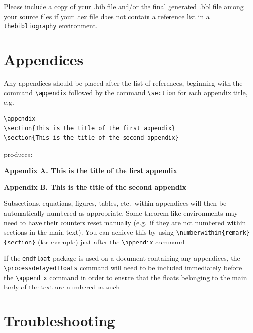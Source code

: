\documentclass[]{interact}
\theoremstyle{plain}%
\theoremstyle{definition}
\theoremstyle{remark}
\begin{document}
Please include a copy of your .bib file and/or the final generated .bbl file among your source files if your .tex file does not contain a reference list in a \texttt{thebibliography} environment.


\section{Appendices}

Any appendices should be placed after the list of references, beginning with the command \verb"\appendix" followed by the command \verb"\section" for each appendix title, e.g.
\begin{verbatim}
\appendix
\section{This is the title of the first appendix}
\section{This is the title of the second appendix}
\end{verbatim}
produces:\medskip

\noindent\textbf{Appendix A. This is the title of the first appendix}\medskip

\noindent\textbf{Appendix B. This is the title of the second appendix}\medskip

\noindent Subsections, equations, figures, tables, etc.\ within appendices will then be automatically numbered as appropriate. Some theorem-like environments may need to have their counters reset manually (e.g.\ if they are not numbered within sections in the main text). You can achieve this by using \verb"\numberwithin{remark}{section}" (for example) just after the \verb"\appendix" command.

If the \verb"endfloat" package is used on a document containing any appendices, the \verb"\processdelayedfloats" command will need to be included immediately before the \verb"\appendix" command in order to ensure that the floats belonging to the main body of the text are numbered as such.


\appendix

\section{Troubleshooting}
\end{document}
